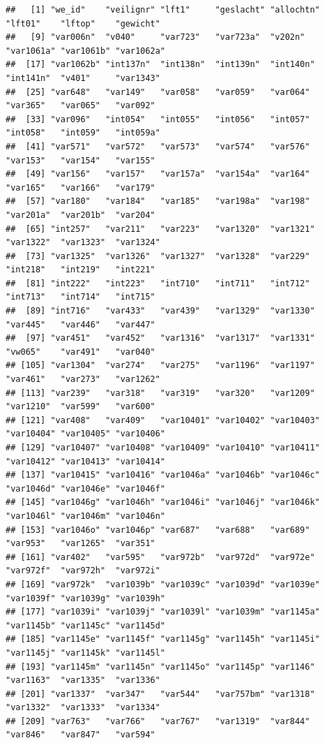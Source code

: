 \documentclass[
]{book}
\begin{document}
\begin{verbatim}
##   [1] "we_id"    "veilignr" "lft1"     "geslacht" "allochtn" "lft01"    "lftop"    "gewicht" 
##   [9] "var006n"  "v040"     "var723"   "var723a"  "v202n"    "var1061a" "var1061b" "var1062a"
##  [17] "var1062b" "int137n"  "int138n"  "int139n"  "int140n"  "int141n"  "v401"     "var1343" 
##  [25] "var648"   "var149"   "var058"   "var059"   "var064"   "var365"   "var065"   "var092"  
##  [33] "var096"   "int054"   "int055"   "int056"   "int057"   "int058"   "int059"   "int059a" 
##  [41] "var571"   "var572"   "var573"   "var574"   "var576"   "var153"   "var154"   "var155"  
##  [49] "var156"   "var157"   "var157a"  "var154a"  "var164"   "var165"   "var166"   "var179"  
##  [57] "var180"   "var184"   "var185"   "var198a"  "var198"   "var201a"  "var201b"  "var204"  
##  [65] "int257"   "var211"   "var223"   "var1320"  "var1321"  "var1322"  "var1323"  "var1324" 
##  [73] "var1325"  "var1326"  "var1327"  "var1328"  "var229"   "int218"   "int219"   "int221"  
##  [81] "int222"   "int223"   "int710"   "int711"   "int712"   "int713"   "int714"   "int715"  
##  [89] "int716"   "var433"   "var439"   "var1329"  "var1330"  "var445"   "var446"   "var447"  
##  [97] "var451"   "var452"   "var1316"  "var1317"  "var1331"  "vw065"    "var491"   "var040"  
## [105] "var1304"  "var274"   "var275"   "var1196"  "var1197"  "var461"   "var273"   "var1262" 
## [113] "var239"   "var318"   "var319"   "var320"   "var1209"  "var1210"  "var599"   "var600"  
## [121] "var408"   "var409"   "var10401" "var10402" "var10403" "var10404" "var10405" "var10406"
## [129] "var10407" "var10408" "var10409" "var10410" "var10411" "var10412" "var10413" "var10414"
## [137] "var10415" "var10416" "var1046a" "var1046b" "var1046c" "var1046d" "var1046e" "var1046f"
## [145] "var1046g" "var1046h" "var1046i" "var1046j" "var1046k" "var1046l" "var1046m" "var1046n"
## [153] "var1046o" "var1046p" "var687"   "var688"   "var689"   "var953"   "var1265"  "var351"  
## [161] "var402"   "var595"   "var972b"  "var972d"  "var972e"  "var972f"  "var972h"  "var972i" 
## [169] "var972k"  "var1039b" "var1039c" "var1039d" "var1039e" "var1039f" "var1039g" "var1039h"
## [177] "var1039i" "var1039j" "var1039l" "var1039m" "var1145a" "var1145b" "var1145c" "var1145d"
## [185] "var1145e" "var1145f" "var1145g" "var1145h" "var1145i" "var1145j" "var1145k" "var1145l"
## [193] "var1145m" "var1145n" "var1145o" "var1145p" "var1146"  "var1163"  "var1335"  "var1336" 
## [201] "var1337"  "var347"   "var544"   "var757bm" "var1318"  "var1332"  "var1333"  "var1334" 
## [209] "var763"   "var766"   "var767"   "var1319"  "var844"   "var846"   "var847"   "var594"  

\end{verbatim}
\end{document}
